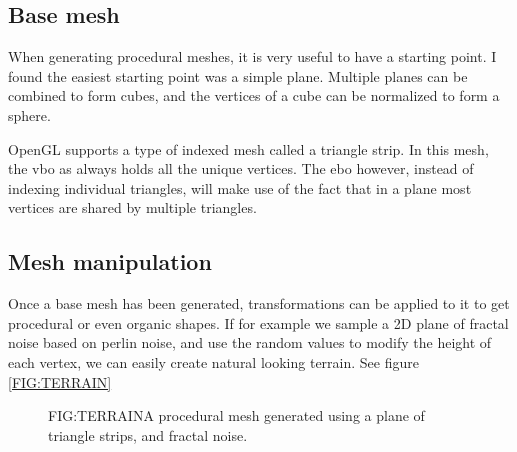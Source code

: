 
\label{SEC:PROCEDURAL}

\subsection{Base mesh}

When generating procedural meshes,
it is very useful to have a starting point.
I found the easiest starting point was a simple plane.
Multiple planes can be combined to form cubes,
and the vertices of a cube can be normalized to form a sphere.

OpenGL supports a type of indexed mesh called a triangle strip.
In this mesh,
the \ac{vbo} as always holds all the unique vertices.
The \ac{ebo} however,
instead of indexing individual triangles,
will make use of the fact that in a plane most vertices are shared by multiple triangles.

\subsection{Mesh manipulation}

Once a base mesh has been generated,
transformations can be applied to it to get procedural or even organic shapes.
If for example we sample a 2D plane of fractal noise based on perlin noise,
and use the random values to modify the height of each vertex,
we can easily create natural looking terrain.
See figure \ref{FIG:TERRAIN}

\begin{figure}[Procedural terrain mesh]{FIG:TERRAIN}{A procedural mesh generated using a plane of triangle strips, and fractal noise.}
\end{figure}


